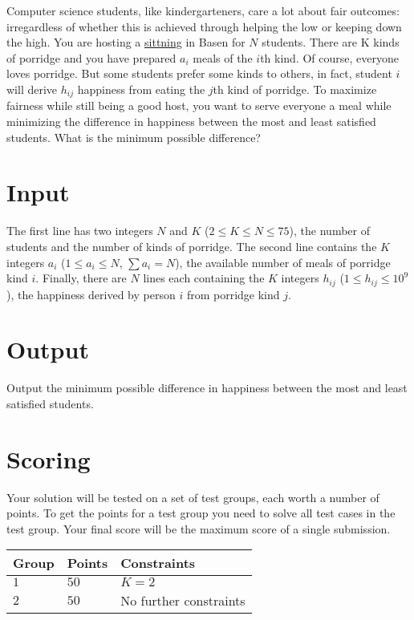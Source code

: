 
Computer science students, like kindergarteners, care a lot about fair outcomes: irregardless of
whether this is achieved through helping the low or keeping down the high. You are hosting a
\href{https://en.wikipedia.org/wiki/Sittning}{sittning} in Basen for $N$ students. There are
K kinds of porridge and you have prepared $a_i$ meals of the $i$th kind.
Of course, everyone loves porridge. But some
students prefer some kinds to others, in fact, student $i$ will derive $h_{ij}$ happiness from
eating the $j$th kind of porridge. To maximize fairness while still being a good host, you want to serve everyone
a meal while minimizing the difference in happiness between the most and least satisfied students.
What is the minimum possible difference?


\section*{Input}

The first line has two integers $N$ and $K$ ($2 \le K \le N \le 75$), the number of students and the
number of kinds of porridge. The second line contains the $K$ integers $a_i$ ($1\le a_i\le N$, $\sum a_i = N$), the
available number of meals of porridge kind $i$. Finally, there are $N$ lines each containing the $K$
integers $h_{ij}$ ($1\le h_{ij}\le 10^9$), the happiness derived by person $i$ from porridge kind
$j$.

\section*{Output}

Output the minimum possible difference in happiness between the most and least satisfied students.

\section*{Scoring}

Your solution will be tested on a set of test groups, each worth a number of points. To get the
points for a test group you need to solve all test cases in the test group. Your final score will be
the maximum score of a single submission.

\noindent
\begin{tabular}{| l | l | l |}
  \hline
  Group & Points & Constraints \\ \hline
  $1$   & $50$       & $K = 2$ \\ \hline
  $2$   & $50$       & No further constraints \\ \hline
\end{tabular}
